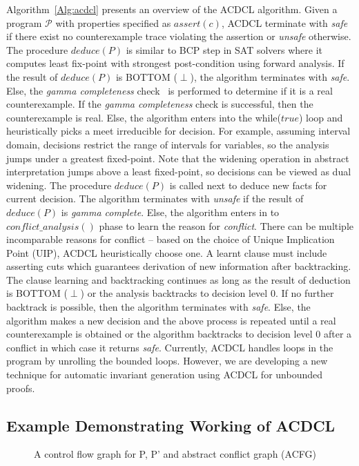 \documentclass[a4paper,conference]{llncs}
\begin{document}
Algorithm~\ref{Alg:acdcl} presents an overview of the ACDCL algorithm.
Given a program $\mathcal{P}$ with properties specified as $assert(c)$,
ACDCL terminate with {\em safe} if there exist no counterexample trace violating the 
assertion or {\em unsafe} otherwise. The procedure $deduce(P)$ is similar 
to BCP step in SAT solvers where it computes least fix-point with 
strongest post-condition using forward analysis. If the result of $deduce(P)$ 
is BOTTOM ($\perp$), the algorithm terminates with {\em safe}. Else, the 
{\em gamma completeness} check~\cite{sas01} is performed to determine if it is a 
real counterexample. If the {\em gamma completeness} check is successful, then the 
counterexample is real. Else, the algorithm enters into the while($true$)
loop and heuristically picks a meet irreducible for decision. For example, assuming 
interval domain, decisions restrict the range of intervals for variables, so the analysis jumps under a 
greatest fixed-point. Note that the widening operation in abstract interpretation 
jumps above a least fixed-point, so decisions can be viewed as 
dual widening. The procedure $deduce(P)$ is called next to deduce new facts for 
current decision. The algorithm terminates with {\em unsafe} if the result of $deduce(P)$ 
is {\em gamma complete}. Else, the algorithm enters in to $conflict\_analysis()$ phase to learn 
the reason for {\em conflict}. There can be multiple incomparable reasons for conflict --
based on the choice of Unique Implication Point (UIP), ACDCL heuristically choose one. 
A learnt clause must include asserting cuts which guarantees
derivation of new information after backtracking. The clause learning and backtracking continues 
as long as the result of deduction is BOTTOM ($\perp$) or the 
analysis backtracks to decision level 0. If no further backtrack is possible, then the 
algorithm terminates with {\em safe}. Else, the algorithm makes a new decision and 
the above process is repeated until a real counterexample is obtained or the algorithm 
backtracks to decision level 0 after a conflict in which case it returns {\em safe}. 
Currently, ACDCL handles loops in the program by unrolling the bounded loops. 
However, we are developing a new technique for automatic invariant generation using 
ACDCL for unbounded proofs. 

%
\subsection{Example Demonstrating Working of ACDCL}
\begin{figure}[htp]
\centering
\vspace*{0.3cm}
\caption{A control flow graph for P, P' and abstract conflict graph (ACFG) \label{fig:filter}}
\end{figure}
\end{document}
